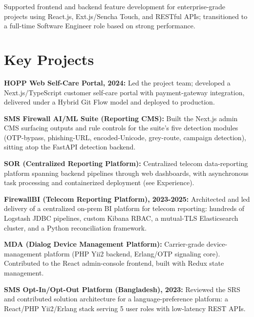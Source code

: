 \documentclass[10.5pt]{article}
\begin{document}
\begin{cvitems}
  \item Supported frontend and backend feature development for enterprise-grade projects using React.js, Ext.js/Sencha Touch, and RESTful APIs; transitioned to a full-time Software Engineer role based on strong performance.
\end{cvitems}

\section*{Key Projects}
\begin{cvitems}
  \item \textbf{HOPP Web Self-Care Portal, 2024:} Led the project team; developed a Next.js/TypeScript customer self-care portal with payment-gateway integration, delivered under a Hybrid Git Flow model and deployed to production.
  \item \textbf{SMS Firewall AI/ML Suite (Reporting CMS):} Built the Next.js admin CMS surfacing outputs and rule controls for the suite's five detection modules (OTP-bypass, phishing-URL, encoded-Unicode, grey-route, campaign detection), sitting atop the FastAPI detection backend.
  \item \textbf{SOR (Centralized Reporting Platform):} Centralized telecom data-reporting platform spanning backend pipelines through web dashboards, with asynchronous task processing and containerized deployment (see Experience).
  \item \textbf{FirewallBI (Telecom Reporting Platform), 2023-2025:} Architected and led delivery of a centralized on-prem BI platform for telecom reporting: hundreds of Logstash JDBC pipelines, custom Kibana RBAC, a mutual-TLS Elasticsearch cluster, and a Python reconciliation framework.
  \item \textbf{MDA (Dialog Device Management Platform):} Carrier-grade device-management platform (PHP Yii2 backend, Erlang/OTP signaling core). Contributed to the React admin-console frontend, built with Redux state management.
  \item \textbf{SMS Opt-In/Opt-Out Platform (Bangladesh), 2023:} Reviewed the SRS and contributed solution architecture for a language-preference platform: a React/PHP Yii2/Erlang stack serving 5 user roles with low-latency REST APIs.
\end{cvitems}
\end{document}
